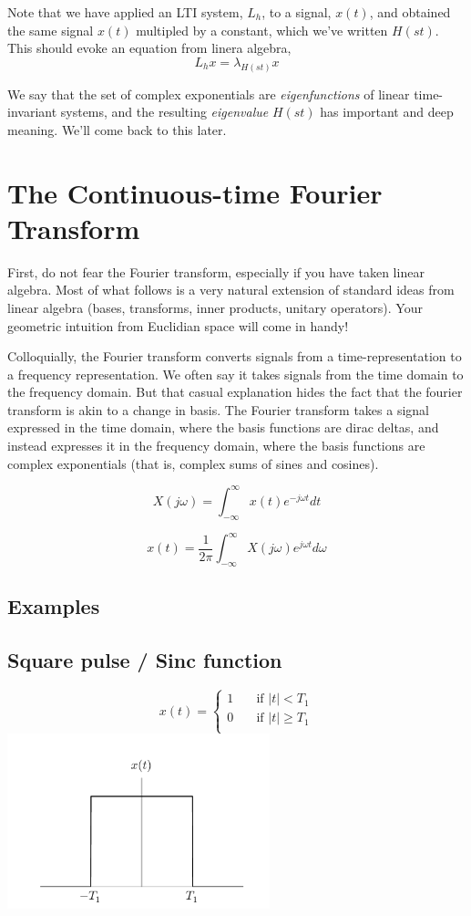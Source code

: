 Note that we have applied an LTI system, $L_h$, to a signal, $x(t)$, and
obtained the same signal $x(t)$ multipled by a constant, which we've written $H(st)$. This should evoke an equation from linera algebra,
\[
L_h x = \lambda_{H(st)} x
\]

We say that the set of complex exponentials are \textit{eigenfunctions} of
linear time-invariant systems, and the resulting \textit{eigenvalue} $H(st)$ 
has important and deep meaning. We'll come back to this later.

\section{The Continuous-time Fourier Transform}
First, do not fear the Fourier transform, especially if you have
taken linear algebra. Most of what follows is a very natural extension
of standard ideas from linear algebra (bases, transforms, inner products,
unitary operators). Your geometric intuition from Euclidian space
will come in handy! 


Colloquially, the Fourier transform converts signals from a
time-representation to a frequency representation. We often say it
takes signals from the time domain to the frequency domain. But that
casual explanation hides the fact that the fourier transform is akin
to a change in basis. The Fourier transform takes a signal expressed
in the time domain, where the basis functions are dirac deltas, and
instead expresses it in the frequency domain, where the basis
functions are complex exponentials (that is, complex sums of sines and
cosines).




\[
X(j\omega) = \int_{-\infty}^{\infty} x(t) e^{-j\omega t} dt
\]

\[
x(t) = \frac{1}{2\pi}\int_{-\infty}^{\infty} X(j\omega) e^{j \omega t} d\omega
\]


\subsection{Examples}
\subsection{Square pulse / Sinc function}

\[ x(t) =
  \begin{cases}
    1  & \quad \text{if } |t| < T_1\\
    0  & \quad \text{if }  |t| \geq T_1 \\
  \end{cases}
\]
\includegraphics[width=3in]{notes.02.square.pdf}



